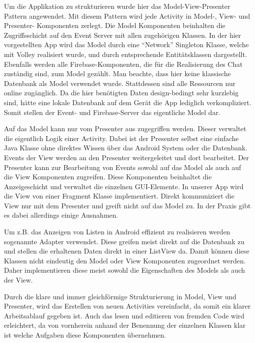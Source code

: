 \documentclass{scrartcl}
\begin{document}
Um die Applikation zu strukturieren wurde hier das Model-View-Presenter Pattern
angewendet. Mit diesem Pattern wird jede Activity in Model-, View- und
Presenter- Komponenten zerlegt. Die Model Komponenten beinhalten die
Zugriffsschicht auf den Event Server mit allen zugehörigen Klassen. In der hier
vorgestellten App wird das Model durch eine \enquote{Network} Singleton Klasse,
welche mit Volley realisiert wurde, und durch entsprechende Entitätsklassen
dargestellt. Ebenfalls werden alle Firebase-Komponenten, die für die
Realisierung des Chat zuständig sind, zum Model gezählt. Man beachte, dass hier
keine klassische Datenbank als Model verwendet wurde. Stattdessen sind alle
Ressourcen nur online zugänglich. Da die hier benötigten Daten design-bedingt
sehr kurzlebig sind, hätte eine lokale Datenbank auf dem Gerät die App
lediglich verkompliziert. Somit stellen der Event- und Firebase-Server das
eigentliche Model dar.

Auf das Model kann nur vom Presenter aus zugegriffen werden. Dieser verwaltet
die eigentlich Logik einer Activity. Dabei ist der Presenter selbst eine
einfache Java Klasse ohne direktes Wissen über das Android System oder die
Datenbank. Events der View werden an den Presenter weitergeleitet und dort
bearbeitet. Der Presenter kann zur Bearbeitung von Events sowohl auf das Model
als auch auf die View Komponenten zugreifen. Diese Komponenten beinhaltet die
Anzeigeschicht und verwaltet die einzelnen GUI-Elemente. In unserer App wird die
View von einer Fragment Klasse implementiert. Direkt kommuniziert die View nur
mit dem Presenter und greift nicht auf das Model zu. In der Praxis gibt es dabei
allerdings einige Ausnahmen.

Um z.B. das Anzeigen von Listen in Android effizient zu realisieren werden
sogenannte Adapter verwendet. Diese greifen meist direkt auf die Datenbank zu
und stellen die erhaltenen Daten direkt in einer ListView da. Damit können diese
Klassen nicht eindeutig den Model oder View Komponenten zugeordnet werden. Daher
implementieren diese meist sowohl die Eigenschaften des Models als auch der
View.

Durch die klare und immer gleichförmige Strukturierung in Model, View und
Presenter, wird das Erstellen von neuen Activities vereinfacht, da somit ein
klarer Arbeitsablauf gegeben ist. Auch das lesen und editieren von fremden Code
wird erleichtert, da von vornherein anhand der Benennung der einzelnen Klassen
klar ist welche Aufgaben diese Komponenten übernehmen.

\newpage
\end{document}
